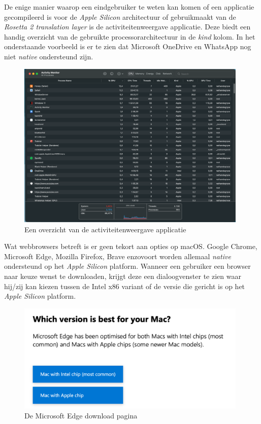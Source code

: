 De enige manier waarop een eindgebruiker te weten kan komen of een applicatie gecompileerd is voor de \textit{Apple Silicon} architectuur of gebruikmaakt van de \textit{Rosetta 2 translation layer} is de activiteitenweergave applicatie. Deze biedt een handig overzicht van de gebruikte processorarchitectuur in de \textit{kind} kolom. In het onderstaande voorbeeld is er te zien dat Microsoft OneDrive en WhatsApp nog niet \textit{native} ondersteund zijn.

\begin{figure}[!h]
	\centering
	\includegraphics[width=110mm, scale=0.7]{img/activitymonitor_macOSM1.png}
	\caption{Een overzicht van de activiteitenweergave applicatie}
\end{figure}

Wat webbrowsers betreft is er geen tekort aan opties op macOS. Google Chrome, Microsoft Edge, Mozilla Firefox, Brave enzovoort worden allemaal \textit{native} ondersteund op het \textit{Apple Silicon} platform. Wanneer een gebruiker een browser naar keuze wenst te downloaden, krijgt deze een dialoogvenster te zien waar hij/zij kan kiezen tussen de Intel x86 variant of de versie die gericht is op het \textit{Apple Silicon} platform.

\begin{figure}[!h]
	\centering
	\includegraphics[width=110mm, scale=0.7]{img/browserversie_macOSM1.png}
	\caption{De Microsoft Edge download pagina \autocite{Microsoft2022}}
\end{figure}

